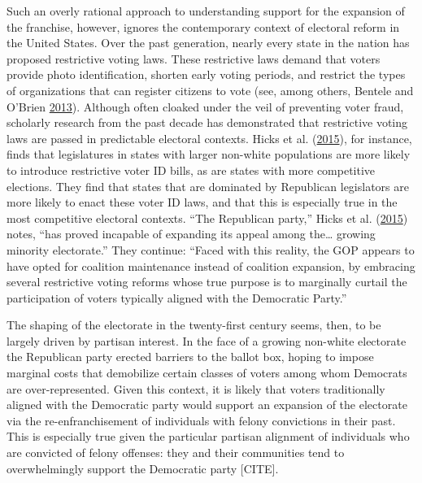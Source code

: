 \documentclass[
  12pt,
]{article}
\begin{document}
Such an overly rational approach to understanding support for the expansion of the franchise, however, ignores the contemporary context of electoral reform in the United States. Over the past generation, nearly every state in the nation has proposed restrictive voting laws. These restrictive laws demand that voters provide photo identification, shorten early voting periods, and restrict the types of organizations that can register citizens to vote (see, among others, Bentele and O'Brien \protect\hyperlink{ref-Bentele2013}{2013}). Although often cloaked under the veil of preventing voter fraud, scholarly research from the past decade has demonstrated that restrictive voting laws are passed in predictable electoral contexts. Hicks et al. (\protect\hyperlink{ref-Hicks2015}{2015}), for instance, finds that legislatures in states with larger non-white populations are more likely to introduce restrictive voter ID bills, as are states with more competitive elections. They find that states that are dominated by Republican legislators are more likely to enact these voter ID laws, and that this is especially true in the most competitive electoral contexts. ``The Republican party,'' Hicks et al. (\protect\hyperlink{ref-Hicks2015}{2015}) notes, ``has proved incapable of expanding its appeal among the\ldots{} growing minority electorate.'' They continue: ``Faced with this reality, the GOP appears to have opted for coalition maintenance instead of coalition expansion, by embracing several restrictive voting reforms whose true purpose is to marginally curtail the participation of voters typically aligned with the Democratic Party.''

The shaping of the electorate in the twenty-first century seems, then, to be largely driven by partisan interest. In the face of a growing non-white electorate the Republican party erected barriers to the ballot box, hoping to impose marginal costs that demobilize certain classes of voters among whom Democrats are over-represented. Given this context, it is likely that voters traditionally aligned with the Democratic party would support an expansion of the electorate via the re-enfranchisement of individuals with felony convictions in their past. This is especially true given the particular partisan alignment of individuals who are convicted of felony offenses: they and their communities tend to overwhelmingly support the Democratic party {[}CITE{]}.
\end{document}

